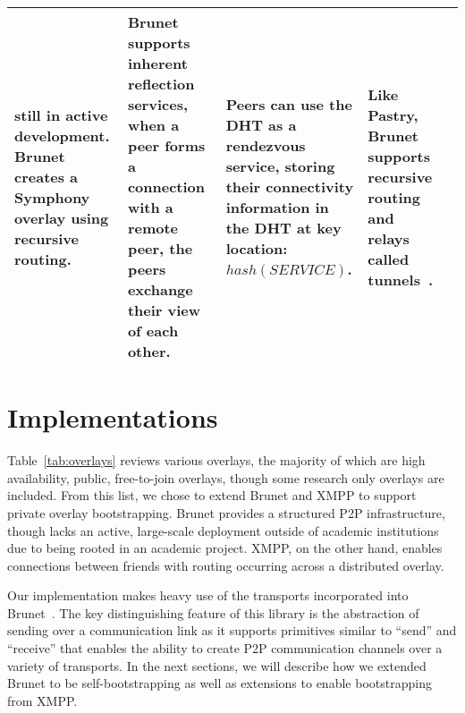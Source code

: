 \documentclass[conference]{IEEEtran}
\begin{document}
\begin{table*}[h!t!]
\begin{tabular}[c]{|m{1.5cm}||m{5.5cm}|m{3cm}|m{3cm}|m{3cm}|}
still in active development.  Brunet creates a Symphony~\cite{symphony} overlay
using recursive routing.
&
Brunet supports inherent reflection services, when a peer forms a connection
with a remote peer, the peers exchange their view of each other.
&
Peers can use the DHT as a rendezvous service, storing their connectivity
information in the DHT at key location:  $hash(SERVICE)$.
&
Like Pastry, Brunet supports recursive routing and relays called
tunnels~\cite{hpdc08_0}.
\\ \hline
\end{tabular}
\caption{Public and Research Overlays}
\label{tab:overlays}
\end{table*}

\section{Implementations}
\label{implementation}

Table~\ref{tab:overlays} reviews various overlays, the majority of which are
high availability, public, free-to-join overlays, though some research only
overlays are included.  From this list, we chose to extend Brunet and XMPP to
support private overlay bootstrapping.  Brunet provides a structured P2P
infrastructure, though lacks an active, large-scale deployment outside of
academic institutions due to being rooted in an academic project.  XMPP, on the
other hand, enables connections between friends with routing occurring across a
distributed overlay.

Our implementation makes heavy use of the transports incorporated into
Brunet~\cite{brunet}.  The key distinguishing feature of this library is the
abstraction of sending over a communication link as it supports primitives
similar to ``send'' and ``receive'' that enables the ability to create P2P
communication channels over a variety of transports.  In the next sections, we
will describe how we extended Brunet to be self-bootstrapping as well as
extensions to enable bootstrapping from XMPP.
\end{document}
